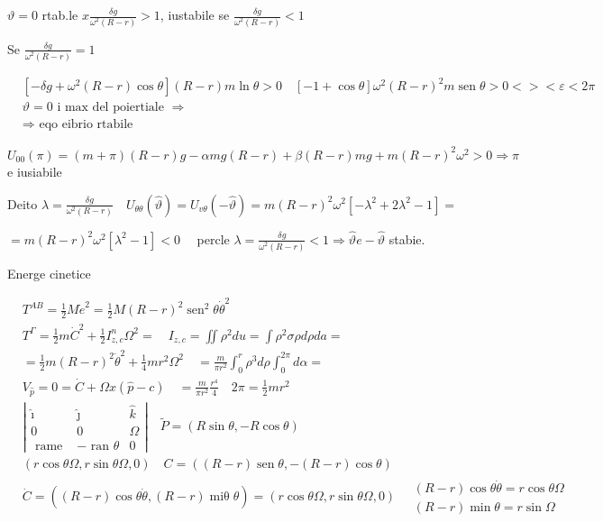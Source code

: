 \documentclass[10pt]{article}
\begin{document}
\(\vartheta=0\) rtab.le \(x \frac{\delta g}{\omega^{2}(R-r)}>1\), iustabile se \(\frac{\delta g}{\omega^{2}(R-r)}<1\)

Se \(\frac{\delta g}{\omega^{2}(R-r)}=1\)

\[
\begin{aligned}
& {\left[-\delta g+\omega^{2}(R-r) \cos \theta\right](R-r) m \ln \theta>0 \quad[-1+\cos \theta] \omega^{2}(R-r)^{2} m \operatorname{sen} \theta>0<><\varepsilon<2 \pi} \\
& \vartheta=0 \text { i max del poiertiale } \Rightarrow \\
& \Rightarrow \text { eqo eibrio rtabile }
\end{aligned}
\]

\(U_{00}(\pi)=(m+\pi)(R-r) g-\alpha m g(R-r)+\beta(R-r) m g+m(R-r)^{2} \omega^{2}>0 \Rightarrow \pi\) e iusiabile

Deito \(\lambda=\frac{\delta g}{\omega^{2}(R-r)} \quad U_{\theta \theta}(\hat{\vartheta})=U_{v \theta}(-\hat{\vartheta})=m(R-r)^{2} \omega^{2}\left[-\lambda^{2}+2 \lambda^{2}-1\right]=\)

\(=m(R-r)^{2} \omega^{2}\left[\lambda^{2}-1\right]<0 \quad\) percle \(\lambda=\frac{\delta g}{\omega^{2}(R-r)}<1 \Rightarrow \hat{\vartheta} e-\hat{\vartheta}\) stabie.

Energe cinetice

\[
\begin{aligned}
& T^{A B}=\frac{1}{2} M \dot{e}^{2}=\frac{1}{2} M(R-r)^{2} \operatorname{sen}^{2} \theta \dot{\theta}^{2} \\
& T^{\Gamma}=\frac{1}{2} m \dot{C}^{2}+\frac{1}{2} I_{z, c}^{n} \Omega^{2}=\quad I_{z, c}=\iint \rho^{2} d u=\int \rho^{2} \sigma \rho d \rho d a= \\
& =\frac{1}{2} m(R-r)^{2} \dot{\theta}^{2}+\frac{1}{4} m r^{2} \Omega^{2} \quad=\frac{m}{\pi r^{2}} \int_{0}^{r} \rho^{3} d \rho \int_{0}^{2 \pi} d \alpha= \\
& V_{\hat{p}}=0=\dot{C}+\Omega x(\hat{p}-c) \quad=\frac{m}{\pi r^{2}} \frac{r^{4}}{4} \quad 2 \pi=\frac{1}{2} m r^{2} \\
& \left|\begin{array}{ccc}
\hat{\imath} & \hat{\jmath} & \hat{k} \\
0 & 0 & \Omega \\
\text { rame } & - \text { ran } \theta & 0
\end{array}\right| \quad \tilde{P}=(R \sin \theta,-R \cos \theta) \\
& (r \cos \theta \Omega, r \sin \theta \Omega, 0) \quad C=((R-r) \operatorname{sen} \theta,-(R-r) \cos \theta) \\
& \dot{C}=((R-r) \cos \theta \dot{\theta},(R-r) \operatorname{mi\theta } \theta)=(r \cos \theta \Omega, r \sin \theta \Omega, 0) \quad \begin{array}{l}
(R-r) \cos \theta \dot{\theta}=r \cos \theta \Omega \\
(R-r) \min \theta=r \sin \Omega
\end{array}
\end{aligned}
\]
\end{document}
